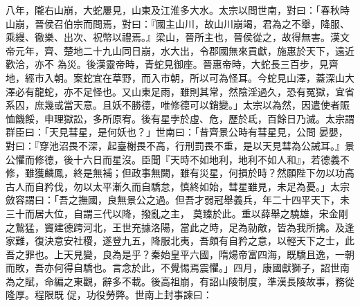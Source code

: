 \begin{pinyinscope}
 八年，隴右山崩，大蛇屢見，山東及江淮多大水。太宗以問世南，對曰：「春秋時山崩，晉侯召伯宗而問焉，對曰：『國主山川，故山川崩竭，君為之不舉，降服、乘縵、徹樂、出次、祝幣以禮焉。』梁山，晉所主也，晉侯從之，故得無害。漢文帝元年，齊、楚地二十九山同日崩，水大出，令郡國無來貢獻，施惠於天下，遠近歡洽，亦不
 為災。後漢靈帝時，青蛇見御座。晉惠帝時，大蛇長三百步，見齊地，經市入朝。案蛇宜在草野，而入市朝，所以可為怪耳。今蛇見山澤，蓋深山大澤必有龍蛇，亦不足怪也。又山東足雨，雖則其常，然陰淫過久，恐有冤獄，宜省系囚，庶幾或當天意。且妖不勝德，唯修德可以銷變。」太宗以為然，因遣使者賑恤饑餒，申理獄訟，多所原宥。後有星孛於虛、危，歷於氐，百餘日乃滅。太宗謂群臣曰：「天見彗星，是何妖也？」世南曰：「昔齊景公時有彗星見，公問
 晏嬰，對曰：『穿池沼畏不深，起臺榭畏不高，行刑罰畏不重，是以天見彗為公誡耳。』景公懼而修德，後十六日而星沒。臣聞『天時不如地利，地利不如人和』，若德義不修，雖獲麟鳳，終是無補；但政事無闕，雖有災星，何損於時？然願陛下勿以功高古人而自矜伐，勿以太平漸久而自驕怠，慎終如始，彗星雖見，未足為憂。」太宗斂容謂曰：「吾之撫國，良無景公之過。但吾才弱冠舉義兵，年二十四平天下，未三十而居大位，自謂三代以降，撥亂之主，
 莫臻於此。重以薛舉之驍雄，宋金剛之鷙猛，竇建德跨河北，王世充據洛陽，當此之時，足為勍敵，皆為我所擒。及逢家難，復決意安社稷，遂登九五，降服北夷，吾頗有自矜之意，以輕天下之士，此吾之罪也。上天見變，良為是乎？秦始皇平六國，隋煬帝富四海，既驕且逸，一朝而敗，吾亦何得自驕也。言念於此，不覺惕焉震懼。」四月，康國獻獅子，詔世南為之賦，命編之東觀，辭多不載。後高祖崩，有詔山陵制度，準漢長陵故事，務從隆厚。程限既
 促，功役勞弊。世南上封事諫曰：




\end{pinyinscope}

